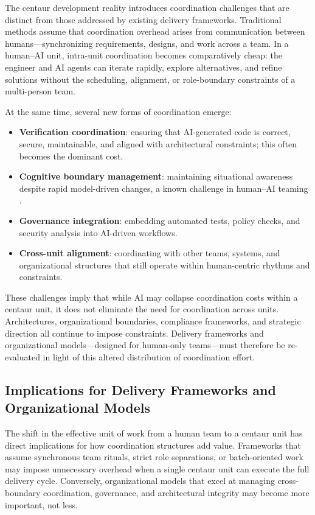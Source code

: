 \documentclass[11pt, a4paper, twocolumn]{article} %
\begin{document}
The centaur development reality introduces coordination challenges that are
distinct from those addressed by existing delivery frameworks. Traditional
methods assume that coordination overhead arises from communication between
humans---synchronizing requirements, designs, and work across a team. In a
human--AI unit, intra-unit coordination becomes comparatively cheap: the
engineer and AI agents can iterate rapidly, explore alternatives, and refine
solutions without the scheduling, alignment, or role-boundary constraints of
a multi-person team.

At the same time, several new forms of coordination emerge:

\begin{itemize}
    \item \textbf{Verification coordination}: ensuring that AI-generated code is
    correct, secure, maintainable, and aligned with architectural constraints;
    this often becomes the dominant cost.
    \item \textbf{Cognitive boundary management}: maintaining situational
    awareness despite rapid model-driven changes, a known challenge in
    human--AI teaming \citep{seeber2020machines,schmutz2024aiteaming}.
    \item \textbf{Governance integration}: embedding automated tests, policy
    checks, and security analysis into AI-driven workflows.
    \item \textbf{Cross-unit alignment}: coordinating with other teams, systems,
    and organizational structures that still operate within human-centric
    rhythms and constraints.
\end{itemize}

These challenges imply that while AI may collapse coordination costs within a
centaur unit, it does not eliminate the need for coordination across units.
Architectures, organizational boundaries, compliance frameworks, and strategic
direction all continue to impose constraints. Delivery frameworks and
organizational models---designed for human-only teams---must therefore be
re-evaluated in light of this altered distribution of coordination effort.

\newpage

\subsection*{Implications for Delivery Frameworks and Organizational Models}

The shift in the effective unit of work from a human team to a centaur unit has
direct implications for how coordination structures add value. Frameworks that
assume synchronous team rituals, strict role separations, or batch-oriented work
may impose unnecessary overhead when a single centaur unit can execute the full
delivery cycle. Conversely, organizational models that excel at managing
cross-boundary coordination, governance, and architectural integrity may become
more important, not less.
\end{document}
